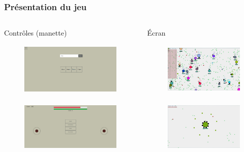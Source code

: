 \documentclass[french,t]{beamer}
\begin{document}
	\begin{frame}
		\frametitle{Présentation du jeu}
		\begin{columns}
			\begin{column}{0.5\textwidth}
				Contrôles (manette)
				\begin{figure}
					\centering
					\includegraphics[height=2.5cm]{images/name}
				\end{figure}
				\begin{figure}
					\centering
					\includegraphics[height=2.5cm]{images/controls}
				\end{figure}
			\end{column}
			\pause
			\begin{column}{0.5\textwidth}
				Écran
				\begin{figure}
					\centering
					\includegraphics[height=2.5cm]{images/fullPlayers}
				\end{figure}
				\begin{figure}
					\centering
					\includegraphics[height=2.5cm]{images/tank-upgrade}
				\end{figure}
			\end{column}
		\end{columns}
			
	\end{frame}
\end{document}
